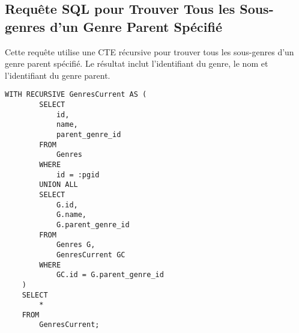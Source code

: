 \subsection{Requête SQL pour Trouver Tous les Sous-genres d'un Genre Parent Spécifié}

Cette requête utilise une CTE récursive pour trouver tous les sous-genres d'un genre parent spécifié. Le résultat inclut l'identifiant du genre, le nom et l'identifiant du genre parent.

\begin{lstlisting}
WITH RECURSIVE GenresCurrent AS (
        SELECT
            id,
            name,
            parent_genre_id
        FROM
            Genres
        WHERE
            id = :pgid
        UNION ALL
        SELECT
            G.id,
            G.name,
            G.parent_genre_id
        FROM
            Genres G,
            GenresCurrent GC
        WHERE
            GC.id = G.parent_genre_id
    )
    SELECT
        *
    FROM
        GenresCurrent;
\end{lstlisting}